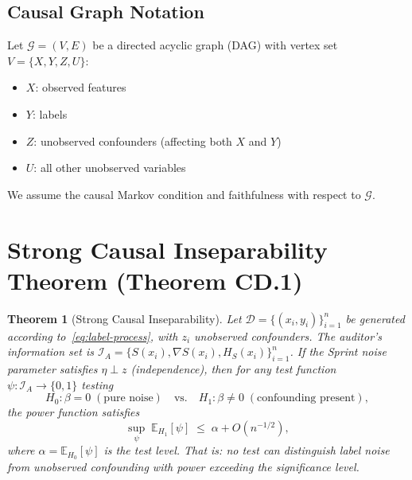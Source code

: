\documentclass[12pt,a4paper]{article}
\newtheorem{theorem}{Theorem}[section]
\newcommand{\E}{\mathbb{E}}
\newcommand{\cD}{\mathcal{D}}
\newcommand{\cG}{\mathcal{G}}
\newcommand{\cI}{\mathcal{I}}
\begin{document}
\subsection{Causal Graph Notation}

Let $\cG = (V, E)$ be a directed acyclic graph (DAG) with vertex set $V = \{X, Y, Z, U\}$:
\begin{itemize}
    \item $X$: observed features
    \item $Y$: labels
    \item $Z$: unobserved confounders (affecting both $X$ and $Y$)
    \item $U$: all other unobserved variables
\end{itemize}
We assume the causal Markov condition and faithfulness with respect to $\cG$.

\section{Strong Causal Inseparability Theorem (Theorem CD.1)}
\label{sec:strong}

\begin{theorem}[Strong Causal Inseparability]\label{thm:strong-insep}
    Let $\cD = \{(x_i, y_i)\}_{i=1}^n$ be generated according to~\eqref{eq:label-process},
    with $z_i$ unobserved confounders. The auditor's information set is $\cI_A = \{S(x_i), \nabla S(x_i), H_S(x_i)\}_{i=1}^n$.
    If the Sprint noise parameter satisfies $\eta \perp z$ (independence), then for any test function
    $\psi: \cI_A \to \{0,1\}$ testing
    \begin{equation*}
        H_0: \beta = 0\;(\text{pure noise}) \quad\text{vs.}\quad
        H_1: \beta \neq 0\;(\text{confounding present}),
    \end{equation*}
    the power function satisfies
    \begin{equation}\label{eq:power-bound}
        \sup_{\psi}\; \E_{H_1}[\psi] \;\leq\; \alpha + O(n^{-1/2}),
    \end{equation}
    where $\alpha = \E_{H_0}[\psi]$ is the test level.
    That is: no test can distinguish label noise from unobserved confounding with power exceeding the significance level.
\end{theorem}
\end{document}
